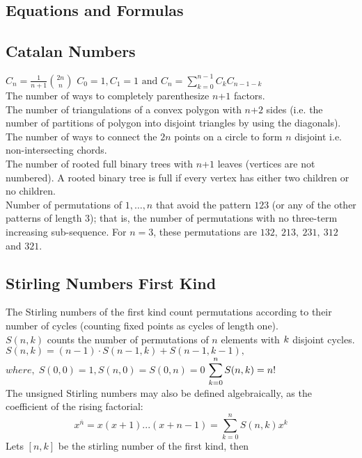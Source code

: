 \begin{multicols*}{\MCOLS}
\newpage
\section{Equations and Formulas}
\subsection{Catalan Numbers}
$\displaystyle C_n=\frac{1}{n+1}{2n \choose n}$
$\displaystyle C_0=1,C_1=1\text{ and }C_n=\sum \limits_{k=0}^{n-1}C_k C_{n-1-k}$ \\
The number of ways to completely parenthesize $n$+$\displaystyle 1$ factors. \\
The number of triangulations of a convex polygon with $n$+$\displaystyle 2$ sides (i.e. the number of partitions of polygon into disjoint triangles by using the diagonals). \\
The number of ways to connect the $\displaystyle 2n$ points on a circle to form $n$ disjoint i.e. non-intersecting chords. \\
The number of rooted full binary trees with $n$+$\displaystyle 1$ leaves (vertices are not numbered). A rooted binary tree is full if every vertex has either two children or no children. \\
Number of permutations of $\displaystyle {1, …, n}$ that avoid the pattern $\displaystyle 123$ (or any of the other patterns of length $3$); that is, the number of permutations with no three-term increasing sub-sequence. For $n = 3$, these permutations are $\displaystyle 132,\ 213,\ 231,\ 312$ and $321.$

\subsection{Stirling Numbers First Kind}
The Stirling numbers of the first kind count permutations according to their number of cycles (counting fixed points as cycles of length one). \\
$S(n,k)$ counts the number of permutations of $n$ elements with $\displaystyle \displaystyle k$ disjoint cycles. \\
$S(n,k)=(n-1) \cdot S(n-1,k)+S(n-1,k-1),$ \(where,\; S(0,0)=1,S(n,0)=S(0,n)=0\)
$\displaystyle \displaystyle\sum_{k=0}^{n}S(n,k) = n!$ \\
The unsigned Stirling numbers may also be defined algebraically, as the coefficient of the rising factorial:
\[\displaystyle x^{\bar{n}} = x(x+1)...(x+n-1) = \sum_{k=0}^{n}{ S(n, k) x^k}\]
Lets $[n, k]$ be the stirling number of the first kind, then


\end{multicols*}
